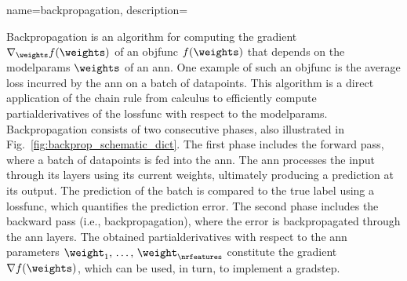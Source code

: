 {name={backpropagation},
 	description={Backpropagation is an \gls{algorithm} for computing the \gls{gradient} 
	 	$\nabla_{\weights} f(\weights)$ of an \gls{objfunc} $f(\weights)$ that depends on the 
	  	\glspl{modelparam} $\weights$ of an \gls{ann}. One example of such an \gls{objfunc} 
	  	is the average \gls{loss} incurred by the \gls{ann} on a \gls{batch} of \glspl{datapoint}. 
	  	This \gls{algorithm} is a direct application of the chain rule from calculus to 
	  	efficiently compute \glspl{partialderivative} of the \gls{lossfunc} with respect to the \glspl{modelparam}.
		Backpropagation consists of two consecutive phases, also illustrated in Fig.\ \ref{fig:backprop_schematic_dict}. 
		The first phase includes the forward pass, where a \gls{batch} of 
		\glspl{datapoint} is fed into the \gls{ann}. The \gls{ann} processes the input through its \glspl{layer} using its current 
		\glspl{weight}, ultimately producing a \gls{prediction} at its \gls{output}. The \gls{prediction} of the \gls{batch} is compared to 
	   	the true \gls{label} using a \gls{lossfunc}, which quantifies the \gls{prediction} error. The second phase includes the 
		backward pass (i.e., backpropagation), where the error is backpropagated through the \gls{ann} \glspl{layer}. 
	   	The obtained \glspl{partialderivative} with respect to the \gls{ann} \glspl{parameter} $\weight_{1},\,\ldots,\,\weight_{\nrfeatures}$ 
	   	constitute the \gls{gradient} $\nabla f(\weights)$, which can be used, in turn, to implement a \gls{gradstep}.
	   	\begin{figure}[H]
		\centering
\end{figure}}}
